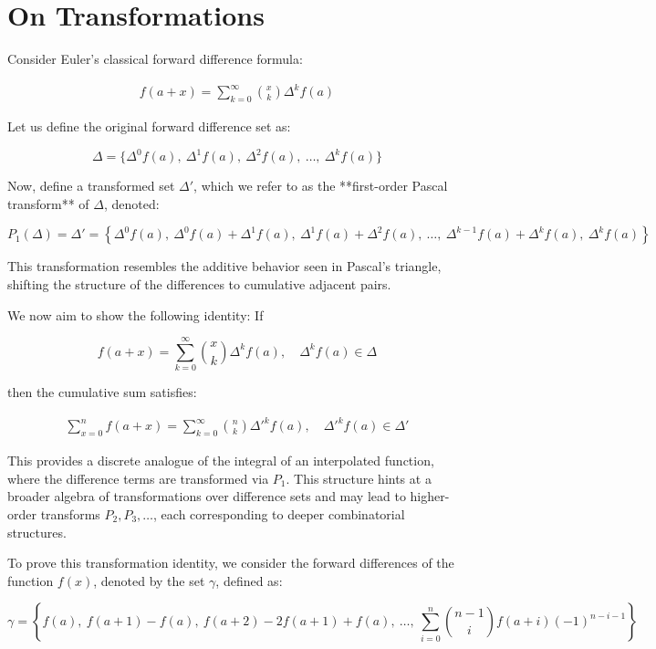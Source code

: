 \section{On Transformations}

Consider Euler's classical forward difference formula:

\begin{align}
f(a + x) = \sum_{k=0}^{\infty} \binom{x}{k} \Delta^k f(a)
\end{align}

Let us define the original forward difference set as:

\[
\Delta = \{ \Delta^0 f(a),\ \Delta^1 f(a),\ \Delta^2 f(a),\ \dots,\ \Delta^k f(a) \}
\]

Now, define a transformed set $\Delta'$, which we refer to as the **first-order Pascal transform** of $\Delta$, denoted:

\[
P_1(\Delta) = \Delta' = \left\{
\Delta^0 f(a),\ \Delta^0 f(a) + \Delta^1 f(a),\ \Delta^1 f(a) + \Delta^2 f(a),\ \dots,\ \Delta^{k-1} f(a) + \Delta^k f(a),\ \Delta^k f(a)
\right\}
\]

This transformation resembles the additive behavior seen in Pascal’s triangle, shifting the structure of the differences to cumulative adjacent pairs.

We now aim to show the following identity:  
If

\[
f(a + x) = \sum_{k=0}^{\infty} \binom{x}{k} \Delta^k f(a), \quad \Delta^k f(a) \in \Delta
\]

then the cumulative sum satisfies:

\begin{align}
\sum_{x=0}^{n} f(a + x) = \sum_{k=0}^{\infty} \binom{n}{k} \Delta'^k f(a), \quad \Delta'^k f(a) \in \Delta'
\end{align}

This provides a discrete analogue of the integral of an interpolated function, where the difference terms are transformed via $P_1$. This structure hints at a broader algebra of transformations over difference sets and may lead to higher-order transforms $P_2, P_3, \dots$, each corresponding to deeper combinatorial structures.

To prove this transformation identity, we consider the forward differences of the function $f(x)$, denoted by the set $\gamma$, defined as:

\[
\gamma = \left\{
f(a),\
f(a+1) - f(a),\
f(a+2) - 2f(a+1) + f(a),\
\dots,\
\sum_{i=0}^{n} \binom{n-1}{i} f(a+i)(-1)^{n-i-1}
\right\}
\]

